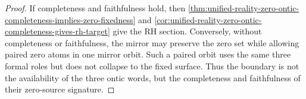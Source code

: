 \begin{proof}
If completeness and faithfulness hold, then
\autoref{thm:unified-reality-zero-ontic-completeness-implies-zero-fixedness}
and
\autoref{cor:unified-reality-zero-ontic-completeness-gives-rh-target}
give the RH section.  Conversely, without completeness or faithfulness,
the mirror may preserve the zero set while allowing paired zero atoms in
one mirror orbit.  Such a paired orbit uses the same three formal roles
but does not collapse to the fixed surface.  Thus the boundary is not
the availability of the three ontic words, but the completeness and
faithfulness of their zero-source signature.
\end{proof}

